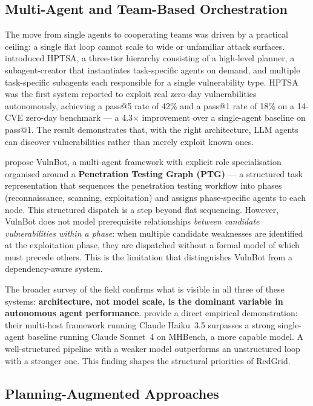 \subsection{Multi-Agent and Team-Based Orchestration}
\label{subsec_multi_agent}

The move from single agents to cooperating teams was driven by a practical ceiling: a single flat loop cannot scale to wide or unfamiliar attack surfaces. \citet{zhu2024hptsa} introduced HPTSA, a three-tier hierarchy consisting of a high-level planner, a subagent-creator that instantiates task-specific agents on demand, and multiple task-specific subagents each responsible for a single vulnerability type. HPTSA was the first system reported to exploit real zero-day vulnerabilities autonomously, achieving a pass@5 rate of 42\% and a pass@1 rate of 18\% on a 14-CVE zero-day benchmark --- a 4.3$\times$ improvement over a single-agent baseline on pass@1. The result demonstrates that, with the right architecture, LLM agents can discover vulnerabilities rather than merely exploit known ones.

\citet{kong2025vulnbot} propose VulnBot, a multi-agent framework with explicit role specialisation organised around a \textbf{Penetration Testing Graph (PTG)} --- a structured task representation that sequences the penetration testing workflow into phases (reconnaissance, scanning, exploitation) and assigns phase-specific agents to each node. This structured dispatch is a step beyond flat sequencing. However, VulnBot does not model prerequisite relationships \emph{between candidate vulnerabilities within a phase}: when multiple candidate weaknesses are identified at the exploitation phase, they are dispatched without a formal model of which must precede others. This is the limitation that distinguishes VulnBot from a dependency-aware system.

The broader survey of the field \citep{wang2025surveyagents} confirms what is visible in all three of these systems: \textbf{architecture, not model scale, is the dominant variable in autonomous agent performance}. \citet{singer2025incalmo} provide a direct empirical demonstration: their multi-host framework running Claude Haiku~3.5 surpasses a strong single-agent baseline running Claude Sonnet~4 on MHBench, a more capable model. A well-structured pipeline with a weaker model outperforms an unstructured loop with a stronger one. This finding shapes the structural priorities of RedGrid.

\subsection{Planning-Augmented Approaches}
\label{subsec_planning_augmented}

